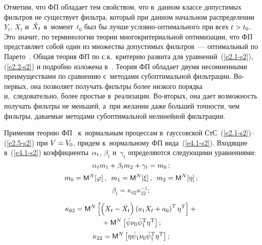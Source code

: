 \begin{multicols}{2}
Отметим, что ФП обладает тем свойством, что в~данном
классе допустимых фильт\-ров не существует фильт\-ра, который при
данном начальном распределении~$Y_t$, $X_t$ и~$\hat X_t$ в~момент~$t_0$ 
был бы лучше услов\-но-оп\-ти\-маль\-но\-го при всех  $t\hm>t_0$. Это
значит, по терминологии теории многокритериальной оптимизации, что
ФП пред\-став\-ля\-ет собой один из мно\-жества
допустимых фильт\-ров~---  оптимальный по Парето~\cite{3-s2}.
Общая теория ФП по с.к.\ критерию развита для урав\-не\-ний~(\ref{e2.1-s2}), (\ref{e2.2-s2})
и подробно изложена в~\cite{3-s2}.
Теория ФП обладает двумя несомненными преимуществами по сравнению с~методами
субоптимальной фильт\-ра\-ции. Во-пер\-вых, она позволяет
получать фильт\-ры более низкого порядка и,~следовательно, более
простые в~реализации. Во-вто\-рых, она дает возможность получать
фильт\-ры не меньшей, а~при желании даже большей точности, чем
фильт\-ры, даваемые методами субоптимальной нелинейной фильт\-рации.

Применяя теорию ФП~\cite{3-s2} 
к~нормальным процессам в~гауссовской СтС~(\ref{e2.1-s2})--(\ref{e2.5-s2}) 
при  $V\hm=V_0$, придем к~нормальному ФП  вида~(\ref{e4.1-s2}). 
Входящие в~(\ref{e4.1-s2}) коэффициенты~$\alpha_t$, $\beta_t$ и~$\gamma_t$ 
определяются следующими уравнениями:
    \begin{equation}
    \alpha_t m_1 + \beta_t m_2 + \gamma_t=m_0\,;
    \label{e4.2-s2}
    \end{equation}
        \begin{equation}
m_0 = {\sf M}^N  [\varphi]\,,\enskip m_1 = {\sf M}^N  [\xi]\,,\enskip m_2 = 
    {\sf M}^N [\eta]\,;
    \label{e4.3-s2}
    \end{equation}
    \begin{equation}
    \beta_t =\kappa_{02} \kappa_{22}^{-1};\label{e4.4-s2}
    \end{equation}
    
    \vspace*{-12pt}
    
    \noindent
    \begin{multline}
    \kappa_{02} = {\sf M}^N \left[\left(X_t - \hat X_t\right) 
    \left(a_1 X_t + a_0\right)^{\mathrm{T}} \eta^{\mathrm{T}}\right]+{}\\
    {}+ {\sf M}^N 
    \left[\bar \psi  \nu_0\bar \psi_1^{\mathrm{T}} \eta^{\mathrm{T}} \right];
    \label{e4.5-s2}
    \end{multline}
    \begin{equation}
    \kappa_{22} = {\sf M}^N \left[\eta\bar\psi_1\nu_0 \bar \psi_1^{\mathrm{T}} 
    \eta^{\mathrm{T}}\right];\label{e4.6-s2}
    \end{equation}
    

\end{multicols}

